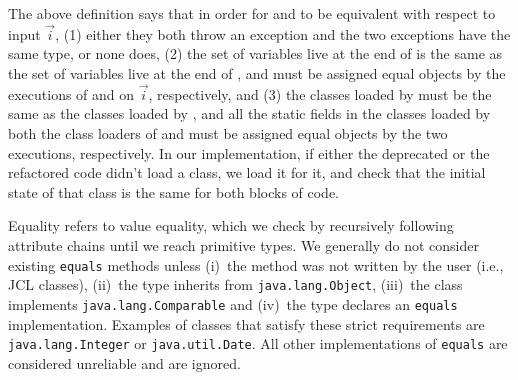 \documentclass[sigconf]{acmart}
\begin{document}

The above definition says that in order for  and
 to be equivalent with respect to input $\vec{i}$,
(1) either they both throw an exception and the two exceptions have the same type, or none does,
(2) the set of variables live at the end of  is the same as the set of variables live at the end of  , and must be
assigned equal objects by the executions of  and
 on $\vec{i}$, respectively, and
(3) the classes loaded by  must be the same as the classes loaded by , and
all the static fields in the classes loaded by both the class loaders of  and  must be assigned equal objects by the
two executions, respectively.
In our implementation, if either the deprecated or the refactored code didn't load a class, we load it for it,
and check that the initial state of that class is the same for both blocks of code.

Equality refers to value equality, which we
check by recursively following attribute chains until we reach
primitive types.
We generally do not consider existing \lstinline[breaklines=true]{equals} methods
unless (i)~the method was not written by the user (i.e.,  JCL classes),
(ii)~the type inherits from \lstinline[breaklines=true]{java.lang.Object}, (iii)~the class
implements \lstinline[breaklines=true]{java.lang.Comparable} and (iv)~the type declares an
\lstinline[breaklines=true]{equals} implementation.  Examples of classes that satisfy these
strict requirements are \lstinline[breaklines=true]{java.lang.Integer} or
\lstinline[breaklines=true]{java.util.Date}.  All other implementations of \lstinline[breaklines=true]{equals} are
considered unreliable and are ignored.





\end{document}
